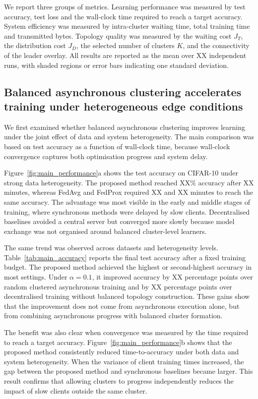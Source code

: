 \documentclass[pdflatex,sn-mathphys-num]{sn-jnl}
\begin{document}
We report three groups of metrics. Learning performance was measured by test accuracy, test loss and the wall-clock time required to reach a target accuracy. System efficiency was measured by intra-cluster waiting time, total training time and transmitted bytes. Topology quality was measured by the waiting cost \(J_T\), the distribution cost \(J_D\), the selected number of clusters \(K\), and the connectivity of the leader overlay. All results are reported as the mean over XX independent runs, with shaded regions or error bars indicating one standard deviation.

\subsection{Balanced asynchronous clustering accelerates training under heterogeneous edge conditions}
\label{subsec:main_performance_results}

We first examined whether balanced asynchronous clustering improves learning under the joint effect of data and system heterogeneity. The main comparison was based on test accuracy as a function of wall-clock time, because wall-clock convergence captures both optimisation progress and system delay.

Figure~\ref{fig:main_performance}a shows the test accuracy on CIFAR-10 under strong data heterogeneity. The proposed method reached XX\% accuracy after XX minutes, whereas FedAvg and FedProx required XX and XX minutes to reach the same accuracy. The advantage was most visible in the early and middle stages of training, where synchronous methods were delayed by slow clients. Decentralised baselines avoided a central server but converged more slowly because model exchange was not organised around balanced cluster-level learners.

The same trend was observed across datasets and heterogeneity levels. Table~\ref{tab:main_accuracy} reports the final test accuracy after a fixed training budget. The proposed method achieved the highest or second-highest accuracy in most settings. Under \(\alpha=0.1\), it improved accuracy by XX percentage points over random clustered asynchronous training and by XX percentage points over decentralised training without balanced topology construction. These gains show that the improvement does not come from asynchronous execution alone, but from combining asynchronous progress with balanced cluster formation.

The benefit was also clear when convergence was measured by the time required to reach a target accuracy. Figure~\ref{fig:main_performance}b shows that the proposed method consistently reduced time-to-accuracy under both data and system heterogeneity. When the variance of client training times increased, the gap between the proposed method and synchronous baselines became larger. This result confirms that allowing clusters to progress independently reduces the impact of slow clients outside the same cluster.
\end{document}
